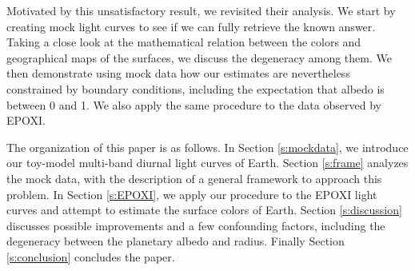 \documentclass[iop,numberedappendix,apj]{emulateapj}
\begin{document}
Motivated by this unsatisfactory result, we revisited their analysis. 
We start by creating mock light curves to see if we can fully retrieve the known answer. 
Taking a close look at the mathematical relation between the colors and geographical maps of the surfaces, we discuss the degeneracy among them. 
We then demonstrate using mock data how our estimates are nevertheless constrained by boundary conditions, including the expectation that albedo is between 0 and 1. 
We also apply the same procedure to the data observed by EPOXI. 

The organization of this paper is as follows. 
In Section \ref{s:mockdata}, we introduce our toy-model multi-band diurnal light curves of Earth. 
Section \ref{s:frame} analyzes the mock data, with the description of a general framework to approach this problem. 
In Section \ref{s:EPOXI}, we apply our procedure to the EPOXI light curves and attempt to estimate the surface colors of Earth. 
Section \ref{s:discussion} discusses possible improvements and a few confounding factors, including the degeneracy between the planetary albedo and radius. 
Finally Section \ref{s:conclusion} concludes the paper. 
\end{document}
